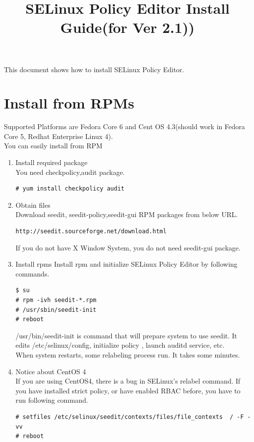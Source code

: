 \documentclass{article}
\title{SELinux Policy Editor Install Guide(for Ver 2.1))}
\begin{document}
\def\labelenumi{(\theenumi)}
\maketitle
\tableofcontents
\newpage

This document shows how to install SELinux Policy Editor.

\section{Install from RPMs}\label{sec:rpm}
Supported Platforms are Fedora Core 6 and Cent OS 4.3(should work in Fedora Core 5, Redhat
Enterprise Linux 4).\\

You can easily install from RPM
\begin{enumerate}
 \item Install required package\\
       You need checkpolicy,audit package.
\begin{verbatim}
# yum install checkpolicy audit
\end{verbatim}

    \item Obtain files\\
Download seedit, seedit-policy,seedit-gui RPM packages from below URL.
\begin{verbatim}
http://seedit.sourceforge.net/download.html
\end{verbatim}
If you do not have X Window System, you do not need seedit-gui package.

 \item Install rpms
Install rpm and initialize SELinux Policy Editor by following commands.
\begin{verbatim}
$ su 
# rpm -ivh seedit-*.rpm
# /usr/sbin/seedit-init
# reboot
\end{verbatim}
 /usr/bin/seedit-init is command that will prepare system to use seedit. It edits /etc/selinux/config, initialize policy , launch auditd service, etc.\\
When system restarts, some relabeling process run. It takes some
	  minutes. \\
\item Notice about CentOS 4\\ 
If you are using CentOS4, there is a bug in SELinux's relabel command.
If you have installed strict policy, or have enabled RBAC before, 
you have to run following command.
\begin{verbatim}
# setfiles /etc/selinux/seedit/contexts/files/file_contexts  / -F -vv
# reboot
\end{verbatim}


\end{enumerate}
\end{document}
